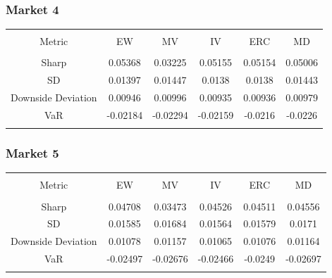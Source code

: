 \documentclass[11pt,preprint, authoryear]{elsarticle}
\let\origtable\table
\let\endorigtable\endtable
\renewenvironment{table}[1][2] {
    \expandafter\origtable\expandafter[H]
} {
    \endorigtable
}
\numberwithin{equation}{section}
\numberwithin{figure}{section}
\numberwithin{table}{section}
\begin{document}
\hypertarget{market-4}{%
\subsubsection{Market 4}\label{market-4}}

\begin{table}[!htbp] \centering 
  \caption{Market 4 Risk Metrics} 
  \label{eigens} 
\begin{tabular}{@{\extracolsep{5pt}} cccccc} 
\\[-1.8ex]\hline 
\hline \\[-1.8ex] 
Metric & EW & MV & IV & ERC & MD \\ 
\hline \\[-1.8ex] 
Sharp & 0.05368 & 0.03225 & 0.05155 & 0.05154 & 0.05006 \\ 
SD & 0.01397 & 0.01447 & 0.0138 & 0.0138 & 0.01443 \\ 
Downside Deviation & 0.00946 & 0.00996 & 0.00935 & 0.00936 & 0.00979 \\ 
VaR & -0.02184 & -0.02294 & -0.02159 & -0.0216 & -0.0226 \\ 
\hline \\[-1.8ex] 
\end{tabular} 
\end{table}

\hypertarget{market-5}{%
\subsubsection{Market 5}\label{market-5}}

\begin{table}[!htbp] \centering 
  \caption{Market 5 Risk Metrics} 
  \label{eigens} 
\begin{tabular}{@{\extracolsep{5pt}} cccccc} 
\\[-1.8ex]\hline 
\hline \\[-1.8ex] 
Metric & EW & MV & IV & ERC & MD \\ 
\hline \\[-1.8ex] 
Sharp & 0.04708 & 0.03473 & 0.04526 & 0.04511 & 0.04556 \\ 
SD & 0.01585 & 0.01684 & 0.01564 & 0.01579 & 0.0171 \\ 
Downside Deviation & 0.01078 & 0.01157 & 0.01065 & 0.01076 & 0.01164 \\ 
VaR & -0.02497 & -0.02676 & -0.02466 & -0.0249 & -0.02697 \\ 
\hline \\[-1.8ex] 
\end{tabular} 
\end{table}
\end{document}
